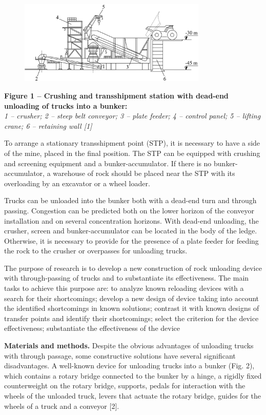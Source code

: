 \begin{figure}[H]
	\centering
	\includegraphics[width=0.8\textwidth]{assets/1350}
	\caption*{}
\end{figure}

{\bfseries Figure 1 -- Crushing and transshipment station with dead-end
unloading of trucks into a bunker:\\
}\emph{1 -- crusher; 2 -- steep belt conveyor; 3 -- plate feeder; 4 --
control panel; 5 -- lifting crane; 6 -- retaining wall {[}1{]}}

To arrange a stationary transshipment point (STP), it is necessary to
have a side of the mine, placed in the final position. The STP can be
equipped with crushing and screening equipment and a bunker-accumulator.
If there is no bunker-accumulator, a warehouse of rock should be placed
near the STP with its overloading by an excavator or a wheel loader.

Trucks can be unloaded into the bunker both with a dead-end turn and
through passing. Congestion can be predicted both on the lower horizon
of the conveyor installation and on several concentration horizons. With
dead-end unloading, the crusher, screen and bunker-accumulator can be
located in the body of the ledge. Otherwise, it is necessary to provide
for the presence of a plate feeder for feeding the rock to the crusher
or overpasses for unloading trucks.

The purpose of research is to develop a new construction of rock
unloading device with through-passing of trucks and to substantiate its
effectiveness. The main tasks to achieve this purpose are: to analyze
known reloading devices with a search for their shortcomings; develop a
new design of device taking into account the identified shortcomings in
known solutions; contrast it with known designs of transfer points and
identify their shortcomings; select the criterion for the device
effectiveness; substantiate the effectiveness of the device

{\bfseries Materials and methods.} Despite the obvious advantages of
unloading trucks with through passage, some constructive solutions have
several significant disadvantages. A well-known device for unloading
trucks into a bunker (Fig. 2), which contains a rotary bridge connected
to the bunker by a hinge, a rigidly fixed counterweight on the rotary
bridge, supports, pedals for interaction with the wheels of the unloaded
truck, levers that actuate the rotary bridge, guides for the wheels of a
truck and a conveyor {[}2{]}.

